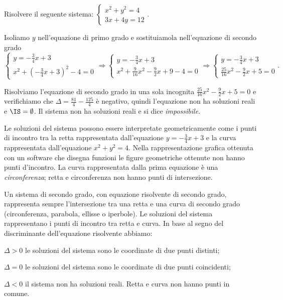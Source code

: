 \begin{exrig}
\begin{esempio}
Risolvere il seguente sistema: $\left\{\begin{array}{l}x^2+y^2=4 \\3x+4y=12\end{array}\right..$

Isoliamo $y$ nell'equazione di primo grado e sostituiamola nell'equazione di secondo grado 
\[\left\{\begin{array}{l}y=-\frac 3 4x+3 \\
x^2+\left(-\frac 3 4x+3\right)^2-4=0\end{array}\right. 
\Rightarrow\left\{\begin{array}{l}y=-\frac 3 4x+3 \\
x^2+\frac 9{16}x^2-\frac 9 2x+9-4=0\end{array}\right. 
\Rightarrow\left\{\begin{array}{l}y=-\frac 3 4x+3 \\
\frac{25}{16}x^2-\frac{9}{2}x+5=0\end{array}\right..\]

Risolviamo l'equazione di secondo grado in una sola incognita $\frac{25}{16}x^2-\frac 9 2x+5=0$ e verifichiamo che $\Delta =\frac{81} 4-\frac{125} 4$ è negativo, quindi l'equazione non ha soluzioni reali e $\IS=\emptyset $. Il sistema non ha soluzioni reali e si dice \emph{impossibile}.

\begin{multicols}{2}
Le soluzioni del sistema possono essere interpretate geometricamente come i punti di incontro tra la retta rappresentata dall'equazione $y=-\frac 3 4x+3$ e la curva rappresentata dall'equazione $x^2+y^2=4$. Nella rappresentazione grafica ottenuta con un software che disegna funzioni le figure geometriche ottenute non hanno punti d'incontro.
La curva rappresentata dalla prima equazione è una \emph{circonferenza}; retta e circonferenza non hanno punti di intersezione.
\begin{center}

\end{center}
 \end{multicols}
\end{esempio}
\end{exrig}

\conclusione
Un sistema di secondo grado, con equazione risolvente di secondo grado, rappresenta sempre l'intersezione tra una retta e una curva di secondo grado (circonferenza, parabola, ellisse o iperbole). Le soluzioni del sistema rappresentano i punti di incontro tra retta e curva. In base al segno del discriminante dell'equazione risolvente abbiamo:
\begin{itemize*}
\item $\Delta >0$ le soluzioni del sistema sono le coordinate di due punti distinti;
\item $\Delta =0$ le soluzioni del sistema sono le coordinate di due punti coincidenti;
\item $\Delta <0$ il sistema non ha soluzioni reali. Retta e curva non hanno punti in comune.
\end{itemize*}
\begin{center}

\end{center}

